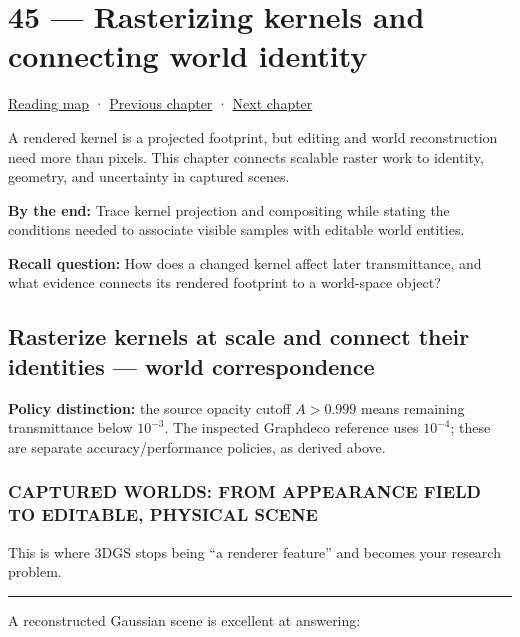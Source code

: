 \hypertarget{06-engine-ii-ch045}{}
\section{45 --- Rasterizing kernels and connecting world identity}\label{rasterizing-kernels-and-connecting-world-identity}

\href{Chapter\%20Edition/03\%20-\%20Game\%20Engine/00\%20-\%20Reading\%20Map}{Reading map} · \hyperref[06-engine-ii-ch044]{Previous chapter} · \hyperref[06-engine-ii-ch046]{Next chapter}

A rendered kernel is a projected footprint, but editing and world reconstruction need more than pixels. This chapter connects scalable raster work to identity, geometry, and uncertainty in captured scenes.

\textbf{By the end:} Trace kernel projection and compositing while stating the conditions needed to associate visible samples with editable world entities.

\textbf{Recall question:} How does a changed kernel affect later transmittance, and what evidence connects its rendered footprint to a world-space object?

\subsection{Rasterize kernels at scale and connect their identities --- world correspondence}\label{rasterize-kernels-at-scale-and-connect-their-identities-world-correspondence}

\textbf{Policy distinction:} the source opacity cutoff \(A>0.999\) means remaining transmittance below \(10^{-3}\). The inspected Graphdeco reference uses \(10^{-4}\); these are separate accuracy/performance policies, as derived above.

\subsubsection{CAPTURED WORLDS: FROM APPEARANCE FIELD TO EDITABLE, PHYSICAL SCENE}\label{captured-worlds-from-appearance-field-to-editable-physical-scene}

This is where 3DGS stops being ``a renderer feature'' and becomes your research problem.

\begin{center}\rule{0.5\linewidth}{0.5pt}\end{center}

A reconstructed Gaussian scene is excellent at answering:

